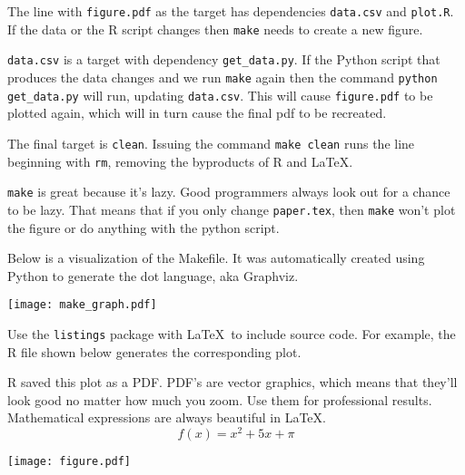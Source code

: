 \documentclass[12pt]{article}
\begin{document}
The line with {\tt figure.pdf} as the target has dependencies {\tt data.csv} and {\tt plot.R}. If the data or the R script changes then {\tt make} needs to create a new figure.

{\tt data.csv} is a target with dependency {\tt get\_data.py}. If the Python script that produces the data changes and we run {\tt make} again then the command {\tt python get\_data.py} will run, updating {\tt data.csv}. This will cause {\tt figure.pdf} to be plotted again, which will in turn cause the final pdf to be recreated.

The final target is {\tt clean}. Issuing the command {\tt make clean} runs the line beginning with {\tt rm}, removing the byproducts of R and \LaTeX.

{\tt make} is great because it's lazy. Good programmers always look out for a chance to be lazy. That means that if you only change {\tt paper.tex}, then {\tt make} won't plot the figure or do anything with the python script.

Below is a visualization of the Makefile. It was automatically created using Python to generate the dot language, aka Graphviz.

\centerline{\texttt{[image: make\_graph.pdf]}}

Use the {\tt listings} package with \LaTeX\ to include source code. For example, the R file shown below generates the corresponding plot.



R saved this plot as a PDF. PDF's are vector graphics, which means that they'll look good no matter how much you zoom. Use them for professional results. Mathematical expressions are always beautiful in \LaTeX. 
\[
    f(x) = x^2 + 5x + \pi
\]

\centerline{\texttt{[image: figure.pdf]}}
\end{document}
